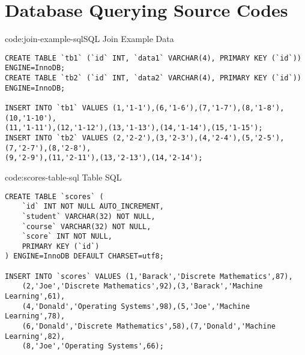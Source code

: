 \section{Database Querying Source Codes}\label{sect:database-querying-codes}

\begin{codeenv}{code:join-example-sql}{SQL Join Example Data}\begin{verbatim}
CREATE TABLE `tb1` (`id` INT, `data1` VARCHAR(4), PRIMARY KEY (`id`)) ENGINE=InnoDB;
CREATE TABLE `tb2` (`id` INT, `data2` VARCHAR(4), PRIMARY KEY (`id`)) ENGINE=InnoDB;

INSERT INTO `tb1` VALUES (1,'1-1'),(6,'1-6'),(7,'1-7'),(8,'1-8'),(10,'1-10'),
(11,'1-11'),(12,'1-12'),(13,'1-13'),(14,'1-14'),(15,'1-15');
INSERT INTO `tb2` VALUES (2,'2-2'),(3,'2-3'),(4,'2-4'),(5,'2-5'),(7,'2-7'),(8,'2-8'),
(9,'2-9'),(11,'2-11'),(13,'2-13'),(14,'2-14');
\end{verbatim}
\end{codeenv}

\begin{codeenv}{code:scores-table-sql}{ Table SQL}\begin{verbatim}
CREATE TABLE `scores` (
    `id` INT NOT NULL AUTO_INCREMENT,
    `student` VARCHAR(32) NOT NULL,
    `course` VARCHAR(32) NOT NULL,
    `score` INT NOT NULL,
    PRIMARY KEY (`id`)
) ENGINE=InnoDB DEFAULT CHARSET=utf8;

INSERT INTO `scores` VALUES (1,'Barack','Discrete Mathematics',87),
    (2,'Joe','Discrete Mathematics',92),(3,'Barack','Machine Learning',61),
    (4,'Donald','Operating Systems',98),(5,'Joe','Machine Learning',78),
    (6,'Donald','Discrete Mathematics',58),(7,'Donald','Machine Learning',82),
    (8,'Joe','Operating Systems',66);
\end{verbatim}
\end{codeenv}


